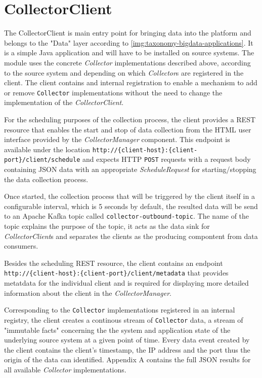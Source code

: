 \section{CollectorClient}

The CollectorClient is main entry point for bringing data into the platform and belongs to the "Data" layer according to
\autoref{img:taxonomy-bigdata-applications}. It is a simple Java application and will have to be installed on source systems.
The module uses the concrete \textit{Collector} implementations described above, according to the source system and
depending on which \textit{Collector}s are registered in the client. The client contains and internal registration to enable
a mechanism to add or remove \verb|Collector| implementations without the need to change the implementation of the
\textit{CollectorClient}.

For the scheduling purposes of the collection process, the client provides a REST resource that enables the start and stop of data
collection from the HTML user interface provided by the \textit{CollectorManager} component.
This endpoint is available under the location \verb|http://{client-host}:{client-port}/client/schedule| and expects HTTP \verb|POST| requests
with a request body containing JSON data with an appropriate \textit{ScheduleRequest} for starting/stopping the data collection process.

Once started, the collection process that will be triggered by the client itself in a configurable interval, which is 5 seconds by default,
the resulted data will be send to an Apache Kafka topic called \verb|collector-outbound-topic|. The name of the topic explains the
purpose of the topic, it acts as the data sink for \textit{CollectorClient}s and separates the clients as the producing compontent
from data consumers.

Besides the scheduling REST resource, the client contains an endpoint \newline \verb|http://{client-host}:{client-port}/client/metadata|
that provides metatdata for the individual client and is required for displaying more detailed information about the client in the
\textit{CollectorManager}.

Corresponding to the \verb|Collector| implementations registered in an internal registry, the client creates a continous stream
of \verb|Collector| data, a stream of "immutable facts" concerning the the system and application state of the underlying source
system at a given point of time. Every data event created by the client contains the client's timestamp, the IP address and the port thus the
origin of the data can identified. Appendix A contains the full JSON results for all available \textit{Collector} implementations.

